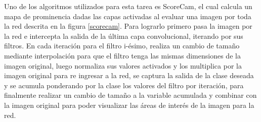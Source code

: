 		Uno de los algoritmos utilizados para esta tarea es ScoreCam, el cual calcula un mapa de prominencia dadas las capas activadas al evaluar una imagen por toda la red descrita en la figura \ref{scorecam}. Para lograrlo primero pasa la imagen por la red e intercepta la salida de la última capa convolucional, iterando por sus filtros. En cada iteración para el filtro i-ésimo, realiza un cambio de tamaño mediante interpolación para que el filtro tenga las mismas dimensiones de la imagen original, luego normaliza sus valores activados y los multiplica por la imagen original para re ingresar a la red, se captura la salida de la clase deseada y se acumula ponderando por la clase los valores del filtro por iteración, para finalmente realizar un cambio de tamaño a la variable acumulada y combinar con la imagen original para poder visualizar las áreas de interés de la imagen para la red.